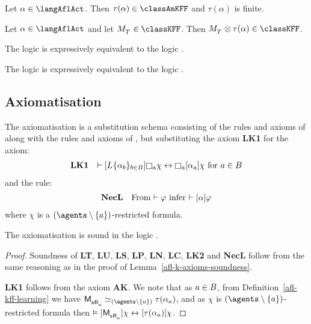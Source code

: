\begin{lemma}\label{afl-kff-structure}
Let $\alpha \in \langAflAct$. Then $\tau(\alpha) \in \classAmKFF$ and $\tau(\alpha)$ is finite.
\end{lemma}

\begin{lemma}\label{afl-kff-exec}
Let $\alpha \in \langAflAct$ and let $\kPModel{\kStatesT} \in \classKFF$.
Then $\kPModel{\kStatesT} \exec \tau(\alpha) \in \classKFF$.
\end{lemma}

\begin{proposition}
The logic \logicAflKFF{} is expressively equivalent to the logic \logicAmlKFF{}.
\end{proposition}

\begin{corollary}
The logic \logicAflKFF{} is expressively equivalent to the logic \logicKFF{}.
\end{corollary}

\subsection{Axiomatisation}

\begin{definition}\label{afl-kff-axioms}
The axiomatisation \axiomAflKFF{} is a substitution schema consisting of the rules and axioms of \axiomKFF{} along with the rules and axioms of \axiomAflK{}, but substituting the \axiomAflK{} axiom {\bf LK1} for the axiom:
$$
\begin{array}{rl}
    {\bf LK1} & \proves \actionA{\learns \{\alpha_\agentB\}_{\agentB \in \agentsB}} \necessaryA \chi \iff \necessaryA \actionA{\alpha_\agentA} \chi \text{ for } \agentA \in \agentsB\\
\end{array}
$$
and the rule:
$$
\begin{array}{rl}
    {\bf NecL} & \text{From $\vdash \varphi$ infer $\vdash {[ {\alpha} ]} \varphi$}
\end{array}
$$
where $\chi$ is a $(\agents \setminus \{\agentA\})$-restricted formula.
\end{definition}

\begin{lemma}\label{afl-kff-axioms-soundness}
The axiomatisation \axiomAflKFF{} is sound in the logic \logicAmlKFF{}.
\end{lemma}

\begin{proof}
Soundness of {\bf LT}, {\bf LU}, {\bf LS}, {\bf LP}, {\bf LN}, {\bf LC}, {\bf LK2} and {\bf NecL} follow from the same reasoning as in the proof of Lemma~\ref{afl-k-axioms-soundness}.

{\bf LK1} follows from the \axiomAmlKFF{} axiom {\bf AK}.
We note that as $a \in B$, from Definition~\ref{afl-kff-learning} we have $\aPModel{\aStateS \aAccessibility{\agentA}} \bisimilar[(\agents \setminus \{\agentA\})] \tau(\alpha_\agentA)$, and as $\chi$ is $(\agents \setminus \{\agentA\})$-restricted formula then $\entails \actionA{\aPModel{\aStateS \aAccessibility{\agentA}}} \chi \iff \actionA{\tau(\alpha_\agentA)} \chi$.
\end{proof}

